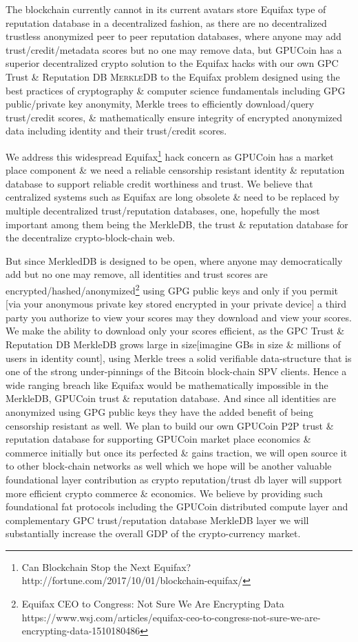 The blockchain currently cannot in its current avatars store Equifax type of reputation database in a decentralized fashion, as there are no decentralized trustless anonymized peer to peer reputation databases, where anyone may add trust/credit/metadata scores but no one may remove data, but GPUCoin has a superior decentralized crypto solution to the Equifax hacks with our own GPC Trust \& Reputation DB \textsc{MerkleDB} to the Equifax problem designed using the best practices of cryptography \& computer science fundamentals including GPG public/private key anonymity, Merkle trees to efficiently download/query trust/credit scores, \& mathematically ensure integrity of encrypted anonymized data including identity and their trust/credit scores.

We address this widespread Equifax\footnote{Can Blockchain Stop the Next Equifax? http://fortune.com/2017/10/01/blockchain-equifax/} hack concern as GPUCoin has a market place component \& we need a reliable censorship resistant identity \& reputation database to support reliable credit worthiness and trust. We believe that centralized systems such as Equifax are long obsolete \& need to be replaced by multiple decentralized trust/reputation databases, one, hopefully the most important among them being the MerkleDB, the trust \& reputation database for the decentralize crypto-block-chain web. 

But since MerkledDB is designed to be open, where anyone may democratically add but no one may remove, all identities and trust scores are encrypted/hashed/anonymized\footnote{Equifax CEO to Congress: Not Sure We Are Encrypting Data https://www.wsj.com/articles/equifax-ceo-to-congress-not-sure-we-are-encrypting-data-1510180486} using GPG public keys and only if you permit [via your anonymous private key stored encrypted in your private device] a third party you authorize to view your scores may they download and view your scores. We make the ability to download only your scores efficient, as the GPC Trust \& Reputation DB MerkleDB grows large in size[imagine GBs in size \& millions of users in identity count], using Merkle trees a solid verifiable data-structure that is one of the strong under-pinnings of the Bitcoin block-chain SPV clients. Hence a wide ranging breach like Equifax would be mathematically impossible in the MerkleDB, GPUCoin trust \& reputation database.
And since all identities are anonymized using GPG public keys they have the added benefit of being censorship resistant as well. We plan to build our own GPUCoin P2P trust \& reputation database for supporting GPUCoin market place economics \& commerce initially but once its perfected \& gains traction, we will open source it to other block-chain networks as well which we hope will be another valuable foundational layer contribution as crypto reputation/trust db layer will support more efficient crypto commerce \& economics. We believe by providing such foundational fat protocols including the GPUCoin distributed compute layer and complementary GPC trust/reputation database MerkleDB layer we will substantially increase the overall GDP of the crypto-currency market.
